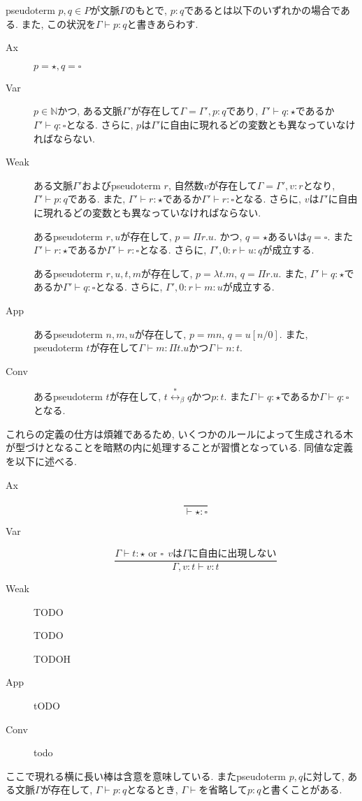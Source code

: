 \documentclass{ltjsarticle}
\begin{document}
\begin{defn}
 pseudoterm $p, q \in P$が文脈$\Gamma$のもとで, $p : q$であるとは以下のいずれかの場合である.
 また, この状況を$\Gamma \vdash p : q$と書きあらわす.
 \begin{description}
  \item[Ax] $p = \star, q = \square$
  \item[Var] $p \in \mathbb{N}$かつ, ある文脈$\Gamma'$が存在して$\Gamma = \Gamma', p : q$であり, $\Gamma' \vdash q : \star$であるか$\Gamma' \vdash q : \square$となる. さらに, $p$は$\Gamma'$に自由に現れるどの変数とも異なっていなければならない.
  \item[Weak] ある文脈$\Gamma'$およびpseudoterm $r$, 自然数$v$が存在して$\Gamma = \Gamma', v : r$となり, $\Gamma' \vdash p : q$である. また, $\Gamma' \vdash r : \star$であるか$\Gamma' \vdash r : \square$となる. さらに, $v$は$\Gamma'$に自由に現れるどの変数とも異なっていなければならない.
  \item[\Pi] あるpseudoterm $r, u$が存在して, $p = \Pi r. u$. かつ, $q = \star$あるいは$q = \square$. また$\Gamma' \vdash r : \star$であるか$\Gamma' \vdash r : \square$となる. さらに, $\Gamma', 0 : r \vdash u : q$が成立する.
  \item[\lambda] あるpseudoterm $r, u, t, m$が存在して, $p = \lambda t. m$, $q = \Pi r. u$. また, $\Gamma' \vdash q : \star$であるか$\Gamma' \vdash q : \square$となる. さらに, $\Gamma', 0 : r \vdash m : u$が成立する.
  \item[App] あるpseudoterm $n, m, u$が存在して, $p = m n$, $q = u[n/0]$. また, pseudoterm $t$が存在して$\Gamma \vdash m : \Pi t. u$かつ$\Gamma \vdash n : t$.
  \item[Conv] あるpseudoterm $t$が存在して, $t \overset{*}{\leftrightarrow}_\beta q$かつ$p : t$. また$\Gamma \vdash q : \star$であるか$\Gamma \vdash q : \square$となる.
 \end{description}
 これらの定義の仕方は煩雑であるため, いくつかのルールによって生成される木が型づけとなることを暗黙の内に処理することが習慣となっている. 同値な定義を以下に述べる.
 \begin{description}
  \item[Ax] \[ \frac{}{\vdash \star \colon \square} \]
  \item[Var] \[ \frac{\Gamma \vdash t : \star \text{ or } \square \ \  \text{$v$は$\Gamma$に自由に出現しない}}{\Gamma, v : t \vdash v : t} \]
  \item[Weak] TODO
  \item[\Pi] TODO
  \item[\lambda] TODOH
  \item[App] tODO
  \item[Conv] todo
 \end{description}
 ここで現れる横に長い棒は含意を意味している. またpseudoterm $p, q$に対して, ある文脈$\Gamma$が存在して, $\Gamma \vdash p : q$となるとき, $\Gamma \vdash$を省略して$p : q$と書くことがある.
\end{defn}
\end{document}
